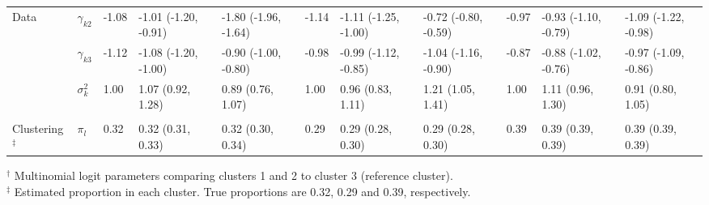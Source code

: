 \documentclass[useAMS,11pt]{article}
\newcommand{\1}{\mathbbm{1}}
\begin{document}
\begin{landscape}
\begin{table}[t]
\begin{center}
\begin{tabular}{lllllllllll}
\hspace{1em}Data& $\gamma_{k2}$ & -1.08 & -1.01 (-1.20, -0.91) & -1.80 (-1.96, -1.64) & -1.14 & -1.11 (-1.25, -1.00) & -0.72 (-0.80, -0.59) & -0.97 & -0.93 (-1.10, -0.79) & -1.09 (-1.22, -0.98)\\
\hspace{1em} & $\gamma_{k3}$ & -1.12 & -1.08 (-1.20, -1.00) & -0.90 (-1.00, -0.80) & -0.98 & -0.99 (-1.12, -0.85) & -1.04 (-1.16, -0.90) & -0.87 & -0.88 (-1.02, -0.76) & -0.97 (-1.09, -0.86)\\
\hspace{1em} & $\sigma^2_{k}$ & 1.00 & 1.07 (0.92, 1.28) & 0.89 (0.76, 1.07) & 1.00 & 0.96 (0.83, 1.11) & 1.21 (1.05, 1.41) & 1.00 & 1.11 (0.96, 1.30) & 0.91 (0.80, 1.05)\\
\addlinespace[0.3em]
\multicolumn{11}{l}{\textbf{ }}\\
\hspace{1em}Clustering$^{\ddagger}$ & $\pi_l$ & 0.32 & 0.32 (0.31, 0.33) & 0.32 (0.30, 0.34) & 0.29 & 0.29 (0.28, 0.30) & 0.29 (0.28, 0.30) & 0.39 & 0.39 (0.39, 0.39) & 0.39 (0.39, 0.39)\\
\bottomrule
\end{tabular}\vspace{-.25cm}
\end{center}
$^{\dagger}$ Multinomial logit parameters comparing clusters 1 and 2 to cluster 3 (reference cluster).\\
$^{\ddagger}$ Estimated proportion in each cluster. True proportions are 0.32, 0.29 and 0.39, respectively.
\end{table}
\end{landscape}
\end{document}
